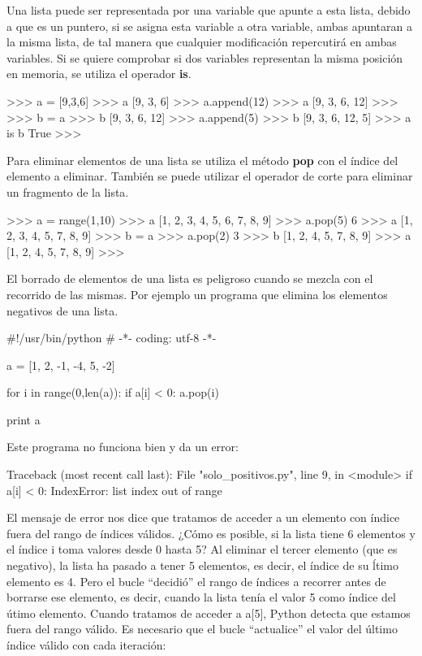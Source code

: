 Una lista puede ser representada por una variable que apunte a esta lista, debido a que es un puntero, si se asigna esta variable a otra variable, ambas apuntaran a la misma lista, de tal manera que cualquier modificación repercutirá en ambas variables. Si se quiere comprobar si dos variables representan la misma posición en memoria, se utiliza el operador \textbf{is}.\\

\begin{pyglist} [language=python]
>>> a = [9,3,6]
>>> a
[9, 3, 6]
>>> a.append(12)
>>> a
[9, 3, 6, 12]
>>> >>> b = a
>>> b
[9, 3, 6, 12]
>>> a.append(5)
>>> b
[9, 3, 6, 12, 5]
>>> a is b
True
>>> 
\end{pyglist}

Para eliminar elementos de una lista se utiliza el método \textbf{pop} con el índice del elemento a eliminar. También se puede utilizar el operador de corte para eliminar un fragmento de la lista.\\

\begin{pyglist} [language=python]
>>> a = range(1,10)
>>> a
[1, 2, 3, 4, 5, 6, 7, 8, 9]
>>> a.pop(5)
6
>>> a
[1, 2, 3, 4, 5, 7, 8, 9]
>>> b = a
>>> a.pop(2)
3
>>> b
[1, 2, 4, 5, 7, 8, 9]
>>> a
[1, 2, 4, 5, 7, 8, 9]
>>> 
\end{pyglist}

El borrado de elementos de una lista es peligroso cuando se mezcla con el recorrido de las mismas. Por ejemplo un programa que elimina los elementos negativos de una lista.\\

\begin{pyglist} [language=python]
#!/usr/bin/python
# -*- coding: utf-8 -*-

a = [1, 2, -1, -4, 5, -2]

for i in range(0,len(a)):
    if a[i] < 0:
        a.pop(i)
  
print a
\end{pyglist}

Este programa no funciona bien y da un error:

\begin{pyglist} [language=python]
Traceback (most recent call last):
  File "solo_positivos.py", line 9, in <module>
    if a[i] < 0:
IndexError: list index out of range
\end{pyglist}

El mensaje de error nos dice que tratamos de acceder a un elemento con índice fuera del rango de índices válidos. ¿Cómo es posible, si la lista tiene 6 elementos y el índice i toma valores desde 0 hasta 5? Al eliminar el tercer elemento (que es negativo), la lista ha pasado a tener 5 elementos, es decir, el índice de su ĺtimo elemento es 4. Pero el bucle ``decidió'' el rango de índices a recorrer antes de borrarse ese elemento, es decir, cuando la lista tenía el valor 5 como índice del útimo elemento. Cuando tratamos de acceder a a[5], Python detecta que estamos fuera del rango válido. Es necesario que el bucle ``actualice'' el valor del último índice válido con cada iteración:\\

